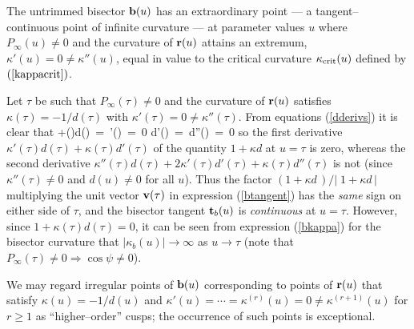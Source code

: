 \begin{lma}
The untrimmed bisector ${\bf b}(u)$ has an {\rm extraordinary point}
--- a tangent--continuous point of infinite curvature --- at parameter
values $u$ where $P_\infty(u)\not=0$ and the curvature of ${\bf r}(u)$
attains an extremum, $\kappa'(u)=0\not=\kappa''(u)$, equal in value
to the critical curvature $\kappa_{\rm crit}(u)$ defined by $(\ref
{kappacrit})$.
\end{lma}

\prf Let $\tau$ be such that $P_\infty(\tau)\not=0$ and the curvature
of ${\bf r}(u)$ satisfies $\kappa(\tau)=-1/d(\tau)$ with $\kappa'(\tau)
=0\not=\kappa''(\tau)$. From equations (\ref{dderivs}) it is clear that
+\kappa(\tau)d(\tau) \,=\, \kappa'(\tau) \,=\, 0
\;\;\Rightarrow\;\; d'(\tau) \,=\, d''(\tau) \,=\, 0
\ee
so the first derivative $\kappa'(\tau)d(\tau)+\kappa(\tau)
d'(\tau)$ of the quantity $1+\kappa d$ at $u=\tau$ is zero, whereas
the second derivative $\kappa''(\tau)d(\tau)+2\kappa'(\tau)d'(\tau)+
\kappa(\tau)d''(\tau)$ is not (since $\kappa''(\tau)\not=
0$ and $d(u)\not=0$ for all $u$). Thus the factor $(1+\kappa d\,)
/ |\;\!1+\kappa d\,|$ multiplying the unit vector ${\bf v}(\tau)$
in expression (\ref{btangent}) has the {\it same\/} sign on either
side of $\tau$, and the bisector tangent ${\bf t}_b(u)$ is
{\it continuous\/} at $u=\tau$. However, since $1+\kappa
(\tau)d(\tau)=0$, it can be seen from expression (\ref{bkappa})
for the bisector curvature that $|\kappa_b(u)|\to\infty$ as
$u\to\tau$ (note that $P_\infty(\tau)\not=0 \Rightarrow
\cos\psi\not=0$).
\QED

We may regard irregular points of ${\bf b}(u)$ corresponding to
points of ${\bf r}(u)$ that satisfy $\kappa(u)=-1/d(u)$ and $\kappa'
(u)=\cdots=\kappa^{(r)}(u)=0\not=\kappa^{(r+1)}(u)$ for $r \ge 1$
as ``higher--order'' cusps; the occurrence of such points is
exceptional.


